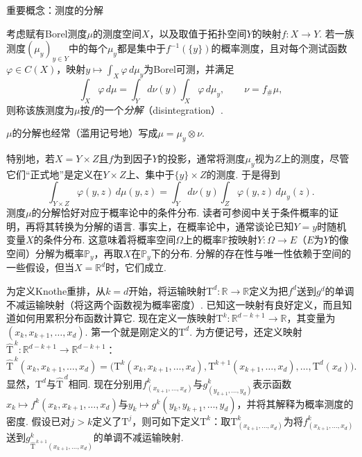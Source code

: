 \begin{sourcebox}{重要概念：测度的分解}\label{box:2.2}
\begin{definition*}
考虑赋有Borel测度$\mu$的测度空间$X$，以及取值于拓扑空间$Y$的映射$f:X\to Y$. 若一族测度$(\mu_y)_{y\in Y}$中的每个$\mu_y$都是集中于$f^{-1}(\{y\})$的概率测度，且对每个测试函数$\varphi\in C(X)$，映射$y\mapsto\int_X\varphi\,d\mu_y$为Borel可测，并满足
\[
\int_X\varphi\,d\mu=\int_Y d\nu(y)\int_X\varphi\,d\mu_y,
\qquad\nu=f_\#\mu,
\]
则称该族测度为$\mu$按$f$的一个\emph{分解}（disintegration）.
\end{definition*}
$\mu$的分解也经常（滥用记号地）写成$\mu=\mu_y\otimes\nu$.

特别地，若$X=Y\times Z$且$f$为到因子$Y$的投影，通常将测度$\mu_y$视为$Z$上的测度，尽管它们“正式地”是定义在$Y\times Z$上、集中于$\{y\}\times Z$的测度. 于是得到
\[
\int_{Y\times Z}\varphi(y,z)\,d\mu(y,z)
=\int_Y d\nu(y)\int_Z\varphi(y,z)\,d\mu_y(z).
\]
测度$\mu$的分解恰好对应于概率论中的条件分布. 读者可参阅\cite{b152}中关于条件概率的证明，再将其转换为分解的语言. 事实上，在概率论中，通常谈论已知$Y=y$时随机变量$X$的条件分布. 这意味着将概率空间$\Omega$上的概率$\mathbb P$按映射$Y:\Omega\to E$（$E$为$Y$的像空间）分解为概率$\mathbb P_y$，再取$X$在$\mathbb P_y$下的分布. 分解的存在性与唯一性依赖于空间的一些假设，但当$X=\mathbb R^d$时，它们成立.
\end{sourcebox}

为定义Knothe重排，从$k=d$开始，将运输映射$\mathrm T^d:\mathbb R\to\mathbb R$定义为把$f^d$送到$g^d$的单调不减运输映射（将这两个函数视为概率密度）. 已知这一映射有良好定义，而且知道如何用累积分布函数计算它. 现在定义一族映射$\mathrm T^k:\mathbb R^{d-k+1}\to\mathbb R$，其变量为$(x_k,x_{k+1},\ldots,x_d)$. 第一个就是刚定义的$\mathrm T^d$. 为方便记号，还定义映射$\widehat{\mathrm T}^{\,k}:\mathbb R^{d-k+1}\to\mathbb R^{d-k+1}$：
\[
\widehat{\mathrm T}^{\,k}(x_k,x_{k+1},\ldots,x_d)
=\bigl(\mathrm T^k(x_k,x_{k+1},\ldots,x_d),\mathrm T^{k+1}(x_{k+1},\ldots,x_d),\ldots,\mathrm T^d(x_d)\bigr).
\]
显然，$\mathrm T^d$与$\widehat{\mathrm T}^{\,d}$相同. 现在分别用$f^k_{(x_{k+1},\ldots,x_d)}$与$g^k_{(y_{k+1},\ldots,y_d)}$表示函数$x_k\mapsto\allowbreak f^k(x_k,\allowbreak x_{k+1},\ldots,x_d)$与$y_k\mapsto\allowbreak g^k(y_k,\allowbreak y_{k+1},\ldots,y_d)$，并将其解释为概率测度的密度. 假设已对$j>k$定义了$\mathrm T^j$，则可如下定义$\mathrm T^k$：取$\mathrm T^k_{(x_{k+1},\ldots,x_d)}$为将$f^k_{(x_{k+1},\ldots,x_d)}$送到$g^k_{\widehat{\mathrm T}^{\,k+1}(x_{k+1},\ldots,x_d)}$的单调不减运输映射.

